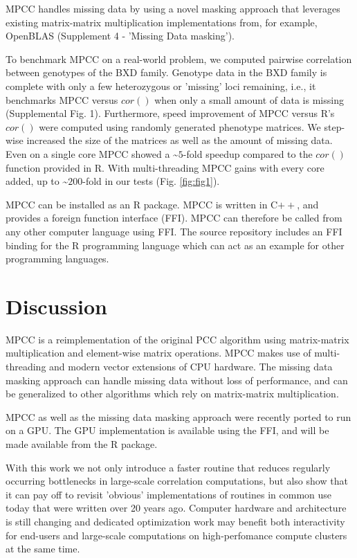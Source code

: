 \documentclass{bioinfo}
\begin{document}
MPCC handles missing data by using a novel masking approach that
leverages existing matrix-matrix multiplication implementations from,
for example, OpenBLAS  (Supplement 4 - 'Missing Data masking').

To benchmark MPCC on a real-world problem, we computed pairwise 
correlation between genotypes of the BXD family. Genotype data in the BXD
family is complete with only a few heterozygous or 'missing' loci
remaining, i.e., it benchmarks MPCC versus $cor()$ when only a small amount
of data is missing (Supplemental Fig. 1). Furthermore, speed improvement of MPCC
versus R's $cor()$ were computed using randomly generated phenotype matrices.
We step-wise increased the size of the matrices as well as the amount of
missing data. Even on a single core MPCC showed a \textasciitilde{}$5$-fold
speedup compared to the $cor()$ function provided in R. With multi-threading
MPCC gains with every core added, up to \textasciitilde{}$200$-fold in our
tests (Fig. \ref{fig:fig1}).

MPCC can be installed as an R package. MPCC is written in C$++$, and
provides a foreign function interface (FFI). MPCC can therefore be
called from any other computer language using FFI. The source
repository includes an FFI binding for the R programming language
which can act as an example for other programming languages.

\section{Discussion}

MPCC is a reimplementation of the original PCC algorithm using matrix-matrix
multiplication and element-wise matrix operations. MPCC makes use of
multi-threading and modern vector extensions of CPU hardware. The missing
data masking approach can handle missing data without loss of performance,
and can be generalized to other algorithms which rely on matrix-matrix multiplication.

MPCC as well as the missing data masking approach were recently
ported to run on a GPU. The GPU implementation is available using the
FFI, and will be made available from the R package.

With this work we not only introduce a faster routine that reduces
regularly occurring bottlenecks in large-scale correlation computations, but
also show that it can pay off to revisit 'obvious' implementations
of routines in common use today that were written over 20 years
ago. Computer hardware and architecture is still changing and
dedicated optimization work may benefit both interactivity for
end-users and large-scale computations on high-perfomance compute
clusters at the same time.
\end{document}
